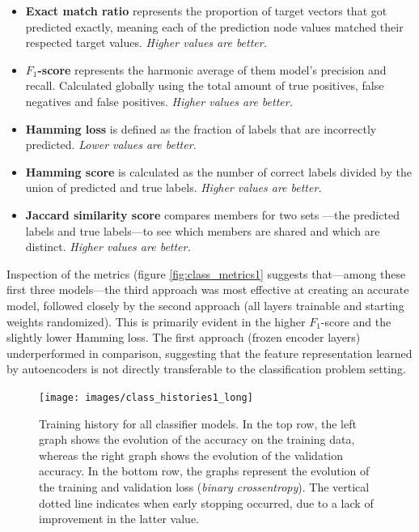 \begin{itemize}
 	\item{\textbf{Exact match ratio} represents the proportion of target vectors that got predicted exactly, meaning each of the prediction node values matched their respected target values. \textit{Higher values are better.}}
	\item{\textbf{$F_1$-score} represents the harmonic average of them model's precision and recall. Calculated globally using the total amount of true positives, false negatives and false positives. \textit{Higher values are better.}}
	\item{\textbf{Hamming loss} is defined as the fraction of labels that are incorrectly predicted. \textit{Lower values are better.}}
	\item{\textbf{Hamming score} is calculated as the number of correct labels divided by the union of predicted and true labels. \textit{Higher values are better.}}
	\item{\textbf{Jaccard similarity score} compares members for two sets ---the predicted labels and true labels---to see which members are shared and which are distinct. \textit{Higher values are better.}}
\end{itemize}

Inspection of the metrics (figure \ref{fig:class_metrics1} suggests that---among these first three models---the third approach was most effective at creating an accurate model, followed closely by the second approach (all layers trainable and starting weights randomized). This is primarily evident in the higher $F_1$-score and the slightly lower Hamming loss.  The first approach (frozen encoder layers) underperformed in comparison, suggesting that the feature representation learned by autoencoders is not directly transferable to the classification problem setting.

\begin{figure}[!htbp]
	\begin{center}
		\texttt{[image: images/class\_histories1\_long]}
		\caption{Training history for all classifier models. In the top row, the left graph shows the evolution of the accuracy on the training data, whereas the right graph shows the evolution of the validation accuracy. In the bottom row, the graphs represent the evolution of the training and validation loss (\textit{binary crossentropy}). The vertical dotted line indicates when early stopping occurred, due to a lack of improvement in the latter value.}
		\label{fig:class_histories1_long}
	\end{center}
\end{figure}



